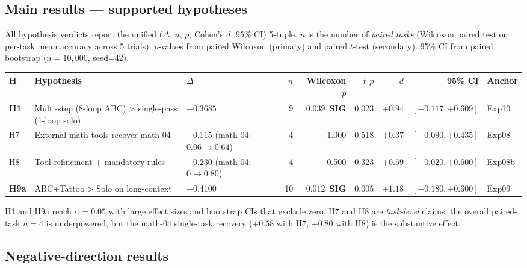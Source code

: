 \documentclass[11pt]{article}
\newcommand{\sig}{\textbf{SIG}}
\begin{document}
\subsection{Main results --- supported hypotheses}\label{sec:main-results}

All hypothesis verdicts report the unified ($\Delta$, $n$, $p$, Cohen's $d$, 95\% CI) 5-tuple. $n$ is the number of \emph{paired tasks} (Wilcoxon paired test on per-task mean accuracy across 5 trials). $p$-values from paired Wilcoxon (primary) and paired $t$-test (secondary). 95\% CI from paired bootstrap ($n\!=\!10{,}000$, seed=42).

\begin{table}[h]
\centering
\footnotesize
\begin{tabular}{@{}p{}p{}p{}rrrrrl@{}}
\toprule
H & Hypothesis & $\Delta$ & $n$ & Wilcoxon $p$ & $t$ $p$ & $d$ & 95\% CI & Anchor \\
\midrule
\textbf{H1} & Multi-step (8-loop ABC) > single-pass (1-loop solo) & $\mathbf{+0.3685}$ & 9 & $\mathbf{0.039}$~\sig & $0.023$ & $+0.94$ & $[+0.117, +0.609]$ & Exp10 \\
H7 & External math tools recover math-04 & $+0.115$ (math-04: $0.06\to0.64$) & 4 & 1.000 & 0.518 & $+0.37$ & $[-0.090, +0.435]$ & Exp08 \\
H8 & Tool refinement + mandatory rules & $+0.230$ (math-04: $0\to0.80$) & 4 & 0.500 & 0.323 & $+0.59$ & $[-0.020, +0.600]$ & Exp08b \\
\textbf{H9a} & ABC+Tattoo > Solo on long-context & $\mathbf{+0.4100}$ & 10 & $\mathbf{0.012}$~\sig & $0.005$ & $+1.18$ & $[+0.180, +0.600]$ & Exp09 \\
\bottomrule
\end{tabular}
\end{table}

H1 and H9a reach $\alpha\!=\!0.05$ with large effect sizes and bootstrap CIs that exclude zero. H7 and H8 are \emph{task-level} claims: the overall paired-task $n\!=\!4$ is underpowered, but the math-04 single-task recovery ($+0.58$ with H7, $+0.80$ with H8) is the substantive effect.

\subsection{Negative-direction results}
\end{document}
